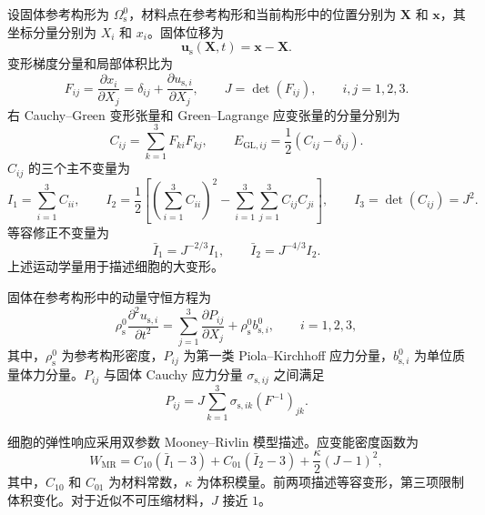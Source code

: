 设固体参考构形为 $\Omega_{\mathrm s}^0$，材料点在参考构形和当前构形中的位置分别为 $\boldsymbol{X}$ 和 $\boldsymbol{x}$，其坐标分量分别为 $X_i$ 和 $x_i$。固体位移为
\begin{equation}
\boldsymbol{u}_{\mathrm s}(\boldsymbol{X},t)
=
\boldsymbol{x}-\boldsymbol{X}.
\label{eq:ch2_solid_motion}
\end{equation}
变形梯度分量和局部体积比为
\begin{equation}
F_{ij}
=
\frac{\partial x_i}{\partial X_j}
=
\delta_{ij}
+
\frac{\partial u_{\mathrm s,i}}{\partial X_j},
\qquad
J=\det\left(F_{ij}\right),
\qquad i,j=1,2,3.
\label{eq:ch2_deformation_gradient}
\end{equation}
右 Cauchy--Green 变形张量和 Green--Lagrange 应变张量的分量分别为
\begin{equation}
C_{ij}
=
\sum_{k=1}^{3}F_{ki}F_{kj},
\qquad
E_{\mathrm{GL},ij}
=
\frac{1}{2}\left(C_{ij}-\delta_{ij}\right).
\label{eq:ch2_strain_tensors}
\end{equation}
$C_{ij}$ 的三个主不变量为
\begin{equation}
I_1
=
\sum_{i=1}^{3}C_{ii},
\qquad
I_2
=
\frac{1}{2}
\left[
\left(\sum_{i=1}^{3}C_{ii}\right)^2
-
\sum_{i=1}^{3}\sum_{j=1}^{3}C_{ij}C_{ji}
\right],
\qquad
I_3
=
\det\left(C_{ij}\right)
=J^2.
\label{eq:ch2_invariants}
\end{equation}
等容修正不变量为
\begin{equation}
\bar I_1=J^{-2/3}I_1,
\qquad
\bar I_2=J^{-4/3}I_2.
\label{eq:ch2_modified_invariants}
\end{equation}
上述运动学量用于描述细胞的大变形\cite{holzapfel2000nonlinear,ogden1997nonlinear,bonet2008nonlinear}。

固体在参考构形中的动量守恒方程为
\begin{equation}
\rho_{\mathrm s}^0
\frac{\partial^2u_{\mathrm s,i}}{\partial t^2}
=
\sum_{j=1}^{3}
\frac{\partial P_{ij}}{\partial X_j}
+
\rho_{\mathrm s}^0b_{\mathrm s,i}^0,
\qquad i=1,2,3,
\label{eq:ch2_solid_momentum_reference}
\end{equation}
其中，$\rho_{\mathrm s}^0$ 为参考构形密度，$P_{ij}$ 为第一类 Piola--Kirchhoff 应力分量，$b_{\mathrm s,i}^0$ 为单位质量体力分量。$P_{ij}$ 与固体 Cauchy 应力分量 $\sigma_{\mathrm s,ij}$ 之间满足
\begin{equation}
P_{ij}
=
J
\sum_{k=1}^{3}
\sigma_{\mathrm s,ik}
\left(F^{-1}\right)_{jk}.
\label{eq:ch2_stress_transform}
\end{equation}

细胞的弹性响应采用双参数 Mooney--Rivlin 模型描述。应变能密度函数为
\begin{equation}
W_{\mathrm{MR}}
=
C_{10}\left(\bar I_1-3\right)
+
C_{01}\left(\bar I_2-3\right)
+
\frac{\kappa}{2}\left(J-1\right)^2,
\label{eq:ch2_mooney_rivlin}
\end{equation}
其中，$C_{10}$ 和 $C_{01}$ 为材料常数，$\kappa$ 为体积模量。前两项描述等容变形，第三项限制体积变化。对于近似不可压缩材料，$J$ 接近 $1$\cite{mooney1940large,rivlin1948large}。

